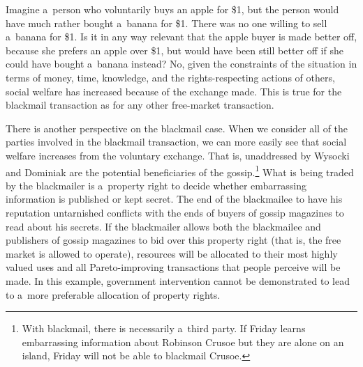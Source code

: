 Imagine a~person who voluntarily buys an apple for \$1, but the person would have much rather bought a~banana for \$1. There was no one willing to sell a~banana for \$1. Is it in any way relevant that the apple buyer is made better off, because she prefers an apple over \$1, but would have been still better off if she could have bought a~banana instead? No, given the constraints of the situation in terms of money, time, knowledge, and the rights-respecting actions of others, social welfare has increased because of the exchange made. This is true for the blackmail transaction as for any other free-market transaction.



There is another perspective on the blackmail case. When we consider all of the parties involved in the blackmail transaction, we can more easily see that social welfare increases from the voluntary exchange. That is, unaddressed by Wysocki and Dominiak are the potential beneficiaries of the gossip.\footnote{With blackmail, there is necessarily a~third party. If Friday learns embarrassing information about Robinson Crusoe but they are alone on an island, Friday will not be able to blackmail Crusoe.} What is being traded by the blackmailer is a~property right to decide whether embarrassing information is published or kept secret. The end of the blackmailee to have his reputation untarnished conflicts with the ends of buyers of gossip magazines to read about his secrets. If the blackmailer allows both the blackmailee and publishers of gossip magazines to bid over this property right (that is, the free market is allowed to operate), resources will be allocated to their most highly valued uses and all Pareto-improving transactions that people perceive will be made. In this example, government intervention cannot be demonstrated to lead to a~more preferable allocation of property rights.




